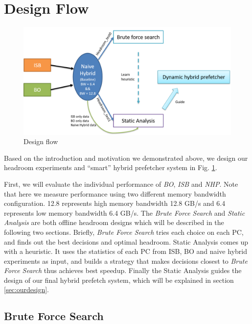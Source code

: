 \section{Design Flow}
\label{sec:designflow}

\begin{figure}[ht!]
	\centering
	\includegraphics[width=1.0\textwidth]{images/design_flow.png}
	\caption{Design flow}
	\label{fig:design_flow}
\end{figure}

Based on the introduction and motivation we demonstrated above, we design our headroom experiments and ``smart'' hybrid prefetcher system in Fig. \ref{fig:design_flow}.

First, we will evaluate the individual performance of \emph{BO}, \emph{ISB} and \emph{NHP}. Note that here we measure performance using two different memory bandwidth configuration. 12.8 represents high memory bandwidth 12.8 GB/s and 6.4 represents low memory bandwidth 6.4 GB/s. The \emph{Brute Force Search} and \emph{Static Analysis} are both offline headroom designs which will be described in the following two sections. Briefly, \emph{Brute Force Search} tries each choice on each PC, and finds out the best decisions and optimal headroom. Static Analysis comes up with a heuristic. It uses the statistics of each PC from ISB, BO and naive hybrid experiments as input, and builds a strategy that makes decisions closest to \emph{Brute Force Search} thus achieves best speedup. Finally the Static Analysis guides the design of our final hybrid prefetch system, which will be explained in section \ref{sec:ourdesign}.

  \subsection{Brute Force Search}
  \label{sec:bruteforcesearch}

